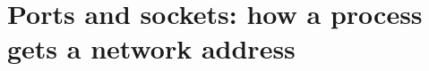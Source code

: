 \chapter{Ports and sockets: how a process gets a network address}
\label{ch:ports-and-sockets-how-a-process-gets-a}

